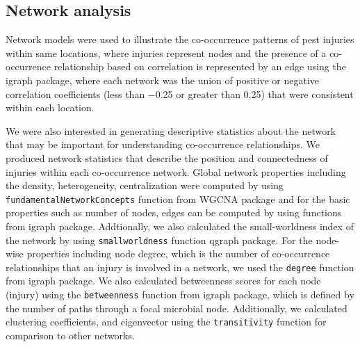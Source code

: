 \subsection*{Network analysis}

Network models were used to illustrate the co-occurrence patterns of pest injuries within same locations, where injuries represent nodes and the presence of a co-occurrence relationship based on correlation is represented by an edge using the igraph package, where each network was the union of positive or negative correlation coefficients (less than −0.25 or greater than 0.25) that were consistent within each location. 

We were also interested in generating descriptive statistics about the network that may be important for understanding co-occurrence relationships. We produced network statistics that describe the position and connectedness of injuries within each co-occurrence network. Global network properties including the density, heterogeneity, centralization were computed by using \texttt{fundamentalNetworkConcepts} function from  WGCNA package and for the basic properties such as number of nodes, edges can be computed by using functions from igraph package. Addtionally, we also calculated the small-worldness index of the network by using \texttt{smallworldness} function qgraph package. For the node-wise properties including node degree, which is the number of co-occurrence relationships that an injury is involved in a network, we used the \texttt{degree} function from igraph package. We also calculated betweenness scores for each node (injury) using the \texttt{betweenness} function from igraph package, which is defined by the number of paths through a focal microbial node. Additionally, we calculated clustering coefficients, and eigenvector using the \texttt{transitivity} function for comparison to other networks.


